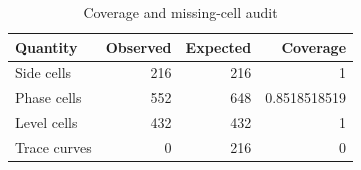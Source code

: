 \begin{table}[htbp]
\centering
\caption{Coverage and missing-cell audit}
\small
\begin{tabular}{@{}lrrr@{}}
\toprule
Quantity & Observed & Expected & Coverage \\
\midrule
Side cells & 216 & 216 & 1 \\
Phase cells & 552 & 648 & 0.8518518519 \\
Level cells & 432 & 432 & 1 \\
Trace curves & 0 & 216 & 0 \\
\bottomrule
\end{tabular}
\end{table}
